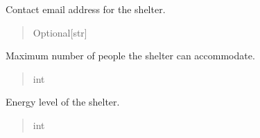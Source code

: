 \documentclass[letterpaper,10pt,english]{sphinxmanual}
\begin{document}
\begin{fulllineitems}
\begin{fulllineitems}
\label{\detokenize{app.models:app.models.shelter.Shelter.email}}
\pysigstartsignatures
\pysigline
{}
\pysigstopsignatures
\sphinxAtStartPar
Contact email address for the shelter.
\begin{quote}\begin{description}
\sphinxAtStartPar
Optional{[}str{]}

\end{description}\end{quote}

\end{fulllineitems}


\begin{fulllineitems}
\label{\detokenize{app.models:app.models.shelter.Shelter.maxPeople}}
\pysigstartsignatures
\pysigline
{}
\pysigstopsignatures
\sphinxAtStartPar
Maximum number of people the shelter can accommodate.
\begin{quote}\begin{description}
\sphinxAtStartPar
int

\end{description}\end{quote}

\end{fulllineitems}


\begin{fulllineitems}
\label{\detokenize{app.models:app.models.shelter.Shelter.energyLevel}}
\pysigstartsignatures
\pysigline
{}
\pysigstopsignatures
\sphinxAtStartPar
Energy level of the shelter.
\begin{quote}\begin{description}
\sphinxAtStartPar
int

\end{description}\end{quote}

\end{fulllineitems}



\end{fulllineitems}
\end{document}
